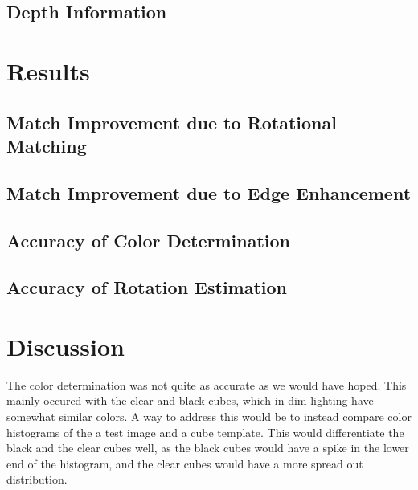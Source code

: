\documentclass[conference]{IEEEtran}
\begin{document}
\subsection{Depth Information}

\section{Results}
\subsection{Match Improvement due to Rotational Matching}

\subsection{Match Improvement due to Edge Enhancement}

\subsection{Accuracy of Color Determination}

\subsection{Accuracy of Rotation Estimation}

\section{Discussion}

The color determination was not quite as accurate as we would have hoped.  This mainly occured with the clear and black cubes, which in dim lighting have somewhat similar colors.  A way to address this would be to instead compare color histograms of the a test image and a cube template.  This would differentiate the black and the clear cubes well, as the black cubes would have a spike in the lower end of the histogram, and the clear cubes would have a more spread out distribution.
\end{document}
